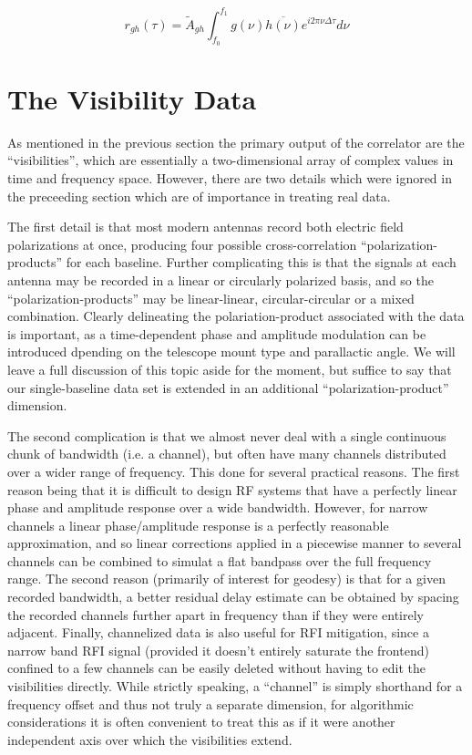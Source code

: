 \begin{equation}
 r_{gh}(\tau) = \tilde{A}_{gh}  \int_{f_0}^{f_1}  g(\nu) \overline{ h(\nu) }  e^{i 2\pi \nu \Delta \tau} d\nu
\end{equation}



\section{The Visibility Data}

As mentioned in the previous section the primary output of the correlator are the ``visibilities'', which are essentially a two-dimensional array of complex values in time and frequency space. However, there are two details which were ignored in the preceeding section which are of importance in treating real data. 

The first detail is that most modern antennas record both electric field polarizations at once, producing four possible cross-correlation ``polarization-products'' for each baseline. Further complicating this is that the signals at each antenna may be recorded in a linear or circularly polarized basis, and so the ``polarization-products'' may be linear-linear, circular-circular or a mixed combination. Clearly delineating the polariation-product associated with the data is important, as a 
time-dependent phase and amplitude modulation can be introduced dpending on the telescope mount type and parallactic angle. We will leave a full discussion of this topic aside for the moment, but suffice to say that our single-baseline data set is extended in an additional ``polarization-product'' dimension.

The second complication is that we almost never deal with a single continuous chunk of bandwidth (i.e. a channel), but often have many channels distributed over a wider range of frequency. This done for several practical reasons. The first reason being that it is difficult to design RF systems that have a perfectly linear phase and amplitude response over a wide bandwidth. However, for narrow channels a linear phase/amplitude response is a perfectly reasonable approximation, and so linear corrections applied in a piecewise manner to several channels can be combined to simulat a flat bandpass over the full frequency range. The second reason (primarily of interest for geodesy) is that for a given recorded bandwidth, a better residual delay estimate can be obtained by spacing the recorded channels further apart in frequency than if they were entirely adjacent. Finally, channelized data
is also useful for RFI mitigation, since a narrow band RFI signal (provided it doesn't entirely saturate the frontend)
confined to a few channels can be easily deleted without having to edit the visibilities directly. While strictly speaking, a ``channel'' is simply shorthand for a frequency offset and thus not truly a separate dimension, for algorithmic considerations it is often convenient to treat this as if it were another independent axis over which the visibilities extend.

